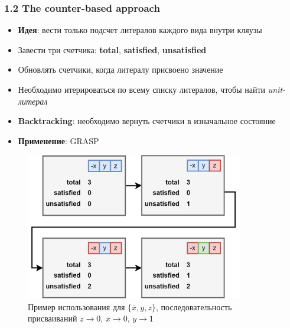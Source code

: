 \documentclass[aspectratio=169,xcolor=table,english]{beamer}
\begin{document}
\begin{frame}[fragile] \frametitle{1.2 The counter-based approach}
    \begin{minipage}[m]{0.5\linewidth}
        \begin{itemize}
            \item \textbf{Идея}: вести только подсчет литералов каждого вида внутри кляузы
            \item Завести три счетчика: \textbf{total}, \textbf{satisfied}, \textbf{unsatisfied}
            \item Обновлять счетчики, когда литералу присвоено значение
            \item Необходимо итерироваться по всему списку литералов, чтобы найти \textit{unit-литерал}
            \item \textbf{Backtracking}: необходимо вернуть счетчики в изначальное состояние
            \item \textbf{Применение}: GRASP
        \end{itemize}
    \end{minipage}\hfill
    \begin{minipage}[m]{0.45\linewidth}
        \begin{figure}
            \centering
            \includegraphics[width=0.85\textwidth]{figures/counter based.png}
            \caption{Пример использования для $\{\overline{x},y,z\}$, последовательность присваиваний $z \rightarrow 0$, $\overline{x} \rightarrow 0$, $y \rightarrow 1$}
        \end{figure}
    \end{minipage}
\end{frame}
\end{document}
